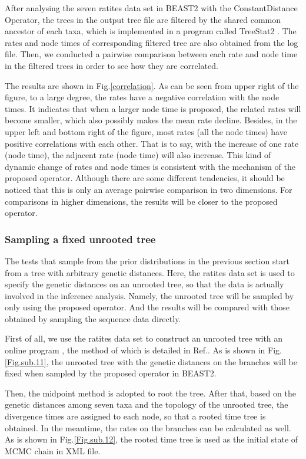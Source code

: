 \documentclass{bmcart}
\begin{document}
After analysing the seven ratites data set in BEAST2 with the ConstantDistance Operator, the trees in the output tree file are filtered by the shared common ancestor of each taxa, which is implemented in a program called TreeStat2 \cite{TreeStat2}. The rates and node times of corresponding filtered tree are also obtained from the log file. Then, we conducted a pairwise comparison between each rate and node time in the filtered trees in order to see how they are correlated. 

The results are shown in Fig.\ref{correlation}. As can be seen from upper right of the figure, to a large degree, the rates have a negative correlation with the node times. It indicates that when a larger node time is proposed, the related rates will become smaller, which also possibly makes the mean rate decline. Besides, in the upper left and bottom right of the figure, most rates (all the node times) have positive correlations with each other. That is to say, with the increase of one rate (node time), the adjacent rate (node time) will also increase. This kind of dynamic change of rates and node times is consistent with the mechanism of the proposed operator. Although there are some different tendencies, it should be noticed that this is only an average pairwise comparison in two dimensions. For comparisons in higher dimensions, the results will be closer to the proposed operator. 

\subsubsection*{Sampling a fixed unrooted tree}
The tests that sample from the prior distributions in the previous section start from a tree with arbitrary genetic distances. Here, the ratites data set is used to specify the genetic distances on an unrooted tree, so that the data is actually involved in the inference analysis. Namely, the unrooted tree will be sampled by only using the proposed operator. And the results will be compared with those obtained by sampling the sequence data directly. 

First of all, we use the ratites data set to construct an unrooted tree with an online program \cite{phyml}, the method of which is detailed in Ref.\cite{guindon2010new}.  As is shown in Fig.\ref{Fig.sub.11}, the unrooted tree with the genetic distances on the branches will be fixed when sampled by the proposed operator in BEAST2. 

Then, the midpoint method is adopted to root the tree. After that, based on the genetic distances among seven taxa and the topology of the unrooted tree, the divergence times are assigned to each node, so that a rooted time tree is obtained. In the meantime, the rates on the branches can be calculated as well. As is shown in Fig.\ref{Fig.sub.12}, the rooted time tree is used as the initial state of MCMC chain in XML file.
\end{document}
